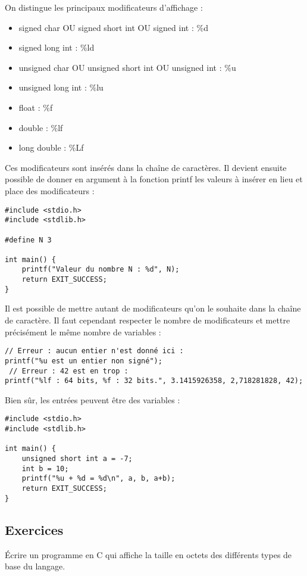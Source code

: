 \documentclass[../../../main.tex]{subfiles}
\begin{document}
On distingue les principaux modificateurs d'affichage :
\begin{itemize}
	\item \textsf{signed char} OU \textsf{signed short int} OU \textsf{signed int} : \textsf{$\%$d}
	\item \textsf{signed long int} : \textsf{$\%$ld}
	\item \textsf{unsigned char} OU \textsf{unsigned short int} OU \textsf{unsigned int} : \textsf{$\%$u}
	\item \textsf{unsigned long int} : \textsf{$\%$lu}
	\item \textsf{float} : \textsf{$\%$f}
	\item \textsf{double} : \textsf{$\%$lf}
	\item \textsf{long double} : \textsf{$\%$Lf}
\end{itemize}
Ces modificateurs sont insérés dans la chaîne de caractères. Il devient ensuite possible de donner en argument à la fonction \textsf{printf} les valeurs à insérer en lieu et place des modificateurs :
\begin{verbatim}
#include <stdio.h>
#include <stdlib.h>

#define N 3

int main() {
	printf("Valeur du nombre N : %d", N);
	return EXIT_SUCCESS;
}
\end{verbatim}
Il est possible de mettre autant de modificateurs qu'on le souhaite dans la chaîne de caractère. Il faut cependant respecter le nombre de modificateurs et mettre précisément le même nombre de variables :
\begin{verbatim}
// Erreur : aucun entier n'est donné ici :
printf("%u est un entier non signé"); 
 // Erreur : 42 est en trop :
printf("%lf : 64 bits, %f : 32 bits.", 3.1415926358, 2,718281828, 42);
\end{verbatim}
Bien sûr, les entrées peuvent être des variables :
\begin{verbatim}
#include <stdio.h>
#include <stdlib.h>

int main() {
	unsigned short int a = -7;
	int b = 10;
	printf("%u + %d = %d\n", a, b, a+b);
	return EXIT_SUCCESS;
}
\end{verbatim}
\subsection{Exercices}
Écrire un programme en C qui affiche la taille en octets des différents types de base du langage.
\end{document}
